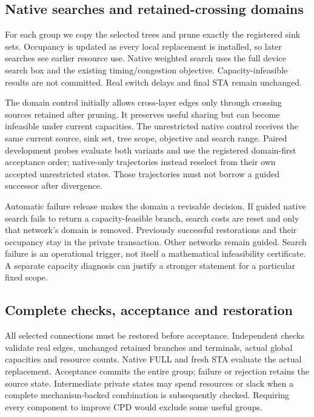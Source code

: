 \documentclass[conference,10pt]{IEEEtran}
\begin{document}
\subsection{Native searches and retained-crossing domains}
For each group we copy the selected trees and prune exactly the registered sink sets. Occupancy is updated as every local replacement is installed, so later searches see earlier resource use. Native weighted search uses the full device search box and the existing timing/congestion objective. Capacity-infeasible results are not committed. Real switch delays and final STA remain unchanged.

The domain control initially allows cross-layer edges only through crossing sources retained after pruning. It preserves useful sharing but can become infeasible under current capacities. The unrestricted native control receives the same current source, sink set, tree scope, objective and search range. Paired development probes evaluate both variants and use the registered domain-first acceptance order; native-only trajectories instead reselect from their own accepted unrestricted states. Those trajectories must not borrow a guided successor after divergence.

Automatic failure release makes the domain a revisable decision. If guided native search fails to return a capacity-feasible branch, search costs are reset and only that network's domain is removed. Previously successful restorations and their occupancy stay in the private transaction. Other networks remain guided. Search failure is an operational trigger, not itself a mathematical infeasibility certificate. A separate capacity diagnosis can justify a stronger statement for a particular fixed scope.

\subsection{Complete checks, acceptance and restoration}
All selected connections must be restored before acceptance. Independent checks validate real edges, unchanged retained branches and terminals, actual global capacities and resource counts. Native FULL and fresh STA evaluate the actual replacement. Acceptance commits the entire group; failure or rejection retains the source state. Intermediate private states may spend resources or slack when a complete mechanism-backed combination is subsequently checked. Requiring every component to improve CPD would exclude some useful groups.
\end{document}
